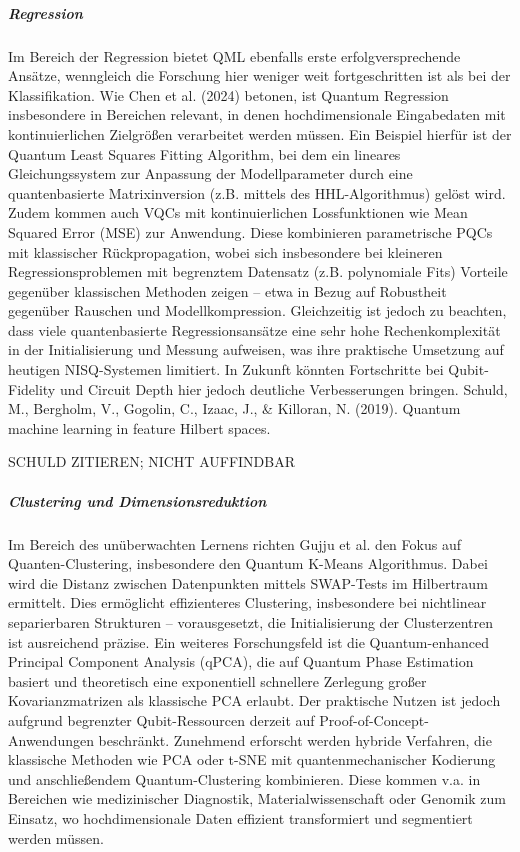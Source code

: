 \subparagraph{Regression}
Im Bereich der Regression bietet QML ebenfalls erste erfolgversprechende Ansätze, wenngleich die Forschung hier weniger weit fortgeschritten ist als bei der Klassifikation. Wie Chen et al. (2024) betonen, ist Quantum Regression insbesondere in Bereichen relevant, in denen hochdimensionale Eingabedaten mit kontinuierlichen Zielgrößen verarbeitet werden müssen. Ein Beispiel hierfür ist der Quantum Least Squares Fitting Algorithm, bei dem ein lineares Gleichungssystem zur Anpassung der Modellparameter durch eine quantenbasierte Matrixinversion (z.B. mittels des HHL-Algorithmus) gelöst wird.
Zudem kommen auch VQCs mit kontinuierlichen Lossfunktionen wie Mean Squared Error (MSE) zur Anwendung. Diese kombinieren parametrische PQCs mit klassischer Rückpropagation, wobei sich insbesondere bei kleineren Regressionsproblemen mit begrenztem Datensatz (z.B. polynomiale Fits) Vorteile gegenüber klassischen Methoden zeigen – etwa in Bezug auf Robustheit gegenüber Rauschen und Modellkompression.
Gleichzeitig ist jedoch zu beachten, dass viele quantenbasierte Regressionsansätze eine sehr hohe Rechenkomplexität in der Initialisierung und Messung aufweisen, was ihre praktische Umsetzung auf heutigen NISQ-Systemen limitiert. In Zukunft könnten Fortschritte bei Qubit-Fidelity und Circuit Depth hier jedoch deutliche Verbesserungen bringen.
Schuld, M., Bergholm, V., Gogolin, C., Izaac, J., & Killoran, N. (2019). Quantum machine learning in feature Hilbert spaces.

SCHULD ZITIEREN; NICHT AUFFINDBAR

\subparagraph{Clustering und Dimensionsreduktion}
Im Bereich des unüberwachten Lernens richten Gujju et al. den Fokus auf Quanten-Clustering, insbesondere den Quantum K-Means Algorithmus. Dabei wird die Distanz zwischen Datenpunkten mittels SWAP-Tests im Hilbertraum ermittelt. Dies ermöglicht effizienteres Clustering, insbesondere bei nichtlinear separierbaren Strukturen – vorausgesetzt, die Initialisierung der Clusterzentren ist ausreichend präzise.
Ein weiteres Forschungsfeld ist die Quantum-enhanced Principal Component Analysis (qPCA), die auf Quantum Phase Estimation basiert und theoretisch eine exponentiell schnellere Zerlegung großer Kovarianzmatrizen als klassische PCA erlaubt. Der praktische Nutzen ist jedoch aufgrund begrenzter Qubit-Ressourcen derzeit auf Proof-of-Concept-Anwendungen beschränkt.
Zunehmend erforscht werden hybride Verfahren, die klassische Methoden wie PCA oder t-SNE mit quantenmechanischer Kodierung und anschließendem Quantum-Clustering kombinieren. Diese kommen v.a. in Bereichen wie medizinischer Diagnostik, Materialwissenschaft oder Genomik zum Einsatz, wo hochdimensionale Daten effizient transformiert und segmentiert werden müssen. \cite{gujjuQuantumMachineLearning2024}


